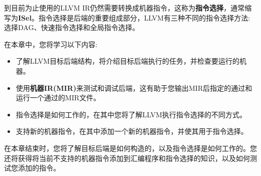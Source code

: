 到目前为止使用的LLVM IR仍然需要转换成机器指令，这称为\textbf{指令选择}，通常缩写为\textbf{ISel}。指令选择是后端的重要组成部分，LLVM有三种不同的指令选择方法:选择DAG、快速指令选择和全局指令选择。\par

在本章中，您将学习以下内容:\par

\begin{itemize}
\item 了解LLVM目标后端结构，将介绍目标后端执行的任务，并检查要运行的机器。
\item 使用\textbf{机器IR(MIR)}来测试和调试后端，这有助于您输出MIR后指定的通过和运行一个通过的MIR文件。
\item 指令选择是如何工作的，在其中您将了解LLVM执行指令选择的不同方式。
\item 支持新的机器指令，在其中添加一个新的机器指令，并使其用于指令选择。
\end{itemize}

在本章结束时，您将了解目标后端是如何构造的，以及指令选择是如何工作的。您还将获得将当前不支持的机器指令添加到汇编程序和指令选择的知识，以及如何测试您添加的指令。\par
















